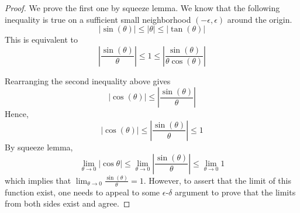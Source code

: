 \documentclass{article}
\theoremstyle{definition}
\theoremstyle{definition}
\theoremstyle{definition}
\theoremstyle{definition}
\theoremstyle{definition}
\theoremstyle{definition}
\theoremstyle{definition}
\theoremstyle{definition}
\theoremstyle{definition}
\begin{document}
\begin{proof}
We prove the first one by squeeze lemma. We know that the following inequality is true on a sufficient small neighborhood $(-\epsilon,\epsilon)$ around the origin.
\[|\sin(\theta)|\le|\theta|\le|\tan(\theta)|\]
This is equivalent to
\[\left|\dfrac{\sin(\theta)}{\theta}\right|\le 1\le \left|\dfrac{\sin(\theta)}{\theta\cos(\theta)}\right|\]

Rearranging the second inequality above gives
\[|\cos(\theta)|\le\left|\dfrac{\sin(\theta)}{\theta}\right|\]
Hence,
\begin{equation}
    |\cos(\theta)|\le \left|\dfrac{\sin(\theta)}{\theta}\right|\le1
\end{equation}
By squeeze lemma,
\begin{equation}
    \lim_{\theta\to0}|\cos\theta|\le\lim_{\theta\to0}\left|\dfrac{\sin(\theta)}{\theta}\right|\le \lim_{\theta\to0}1
\end{equation}
which implies that $\lim_{\theta\to0}\frac{\sin(\theta)}{\theta}=1$. However, to assert that the limit of this function exist, one needs to appeal to some $\epsilon$-$\delta$ argument to prove that the limits from both sides exist and agree.


\end{proof}
\end{document}
